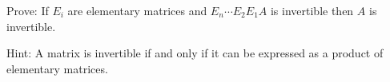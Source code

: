 
\begin{Exercise}[
name={},
title={}, 
difficulty=0,
origin={\cite{YL}}]
Prove: If $E_i$ are elementary matrices and $E_n\cdots E_2E_1A$ is invertible then $A$ is invertible.
\end{Exercise}

\begin{Answer}
Hint: A matrix is invertible if and only if it can be expressed as a product of elementary matrices.
\end{Answer}
